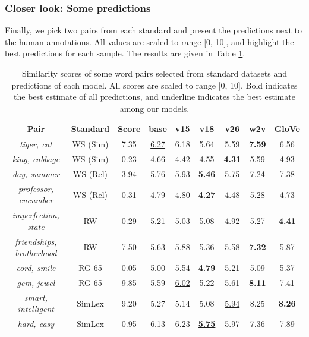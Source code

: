 \subsubsection{Closer look: Some predictions}
Finally, we pick two pairs from each standard and present the predictions next to the human annotations. All values are scaled to range [0, 10], and highlight the best predictions for each sample. The results are given in Table \ref{tab:similarity_samples}.

\begin{table}[!ht]
\centering
\setlength\tabcolsep{2.5pt}
\begin{tabular}{|ccc|cccc|cc|}
\hline
\textbf{Pair} & \textbf{Standard} & \textbf{Score} & \textbf{base} & \textbf{v15} & \textbf{v18} & \textbf{v26} & \textbf{w2v} & \textbf{GloVe} \\ \hline
\textit{tiger, cat} & WS (Sim) & 7.35 & \underline {6.27} & 6.18 & 5.64 & 5.59 & \textbf{7.59} & 6.56 \\
\textit{king, cabbage} & WS (Sim) & 0.23 & 4.66 & 4.42 & 4.55 & \underline {\textbf{4.31}} & 5.59 & 4.93 \\
\textit{day, summer} & WS (Rel) & 3.94 & 5.76 & 5.93 & \underline {\textbf{5.46}} & 5.75 & 7.24 & 7.38 \\
\textit{professor, cucumber} & WS (Rel) & 0.31 & 4.79 & 4.80 & \underline {\textbf{4.27}} & 4.48 & 5.28 & 4.73 \\
\textit{imperfection, state} & RW & 0.29 & 5.21 & 5.03 & 5.08 & \underline {4.92} & 5.27 & \textbf{4.41} \\
\textit{friendships, brotherhood} & RW & 7.50 & 5.63 & \underline {5.88} & 5.36 & 5.58 & \textbf{7.32} & 5.87 \\
\textit{cord, smile} & RG-65 & 0.05 & 5.00 & 5.54 & \underline {\textbf{4.79}} & 5.21 & 5.09 & 5.37 \\
\textit{gem, jewel} & RG-65 & 9.85 & 5.59 & \underline {6.02} & 5.22 & 5.61 & \textbf{8.11} & 7.41 \\
\textit{smart, intelligent} & SimLex & 9.20 & 5.27 & 5.14 & 5.08 & \underline {5.94} & 8.25 & \textbf{8.26} \\
\textit{hard, easy} & SimLex & 0.95 & 6.13 & 6.23 & \underline {\textbf{5.75}} & 5.97 & 7.36 & 7.89 \\ \hline
\end{tabular}
\caption{Similarity scores of some word pairs selected from standard datasets and predictions of each model. All scores are scaled to range {[}0, 10{]}. Bold indicates the best estimate of all predictions, and underline indicates the best estimate among our models.}
\label{tab:similarity_samples}
\end{table}

